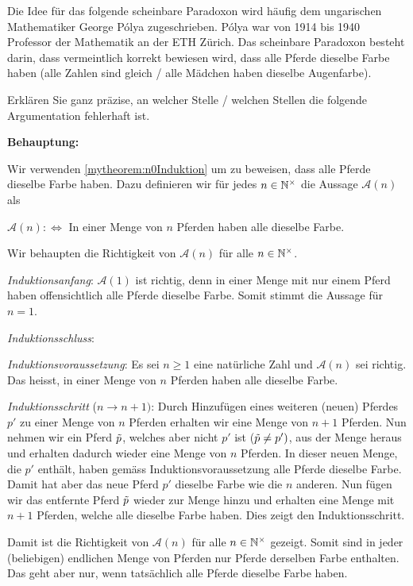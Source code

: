 \clearpage
\begin{myexercise}\label{myexercise:0268}
	Die Idee für das folgende scheinbare Paradoxon wird häufig dem ungarischen Mathematiker George Pólya zugeschrieben. Pólya war von 1914 bis 1940 Professor der Mathematik an der ETH Zürich. Das scheinbare Paradoxon besteht darin, dass vermeintlich korrekt bewiesen wird, dass alle Pferde dieselbe Farbe haben (alle Zahlen sind gleich / alle Mädchen haben dieselbe Augenfarbe).

	Erklären Sie ganz präzise, an welcher Stelle / welchen Stellen die folgende Argumentation fehlerhaft ist.

	\noindent
	\textbf{Behauptung:}

	Wir verwenden \cref{mytheorem:n0Induktion} um zu beweisen, dass alle Pferde dieselbe Farbe haben. Dazu definieren wir für jedes $n\in\mathbb{N}^{\times}$ die Aussage $\mathcal{A}(n)$ als
	\begin{center}
		$\mathcal{A}(n) :\iff $ In einer Menge von $n$ Pferden haben alle dieselbe Farbe.
	\end{center}
	Wir behaupten die Richtigkeit von $\mathcal{A}(n)$ für alle $n\in\mathbb{N}^{\times}$.

	\begin{myproof}
		\begin{aenum}
			\item \textit{Induktionsanfang}: $\mathcal{A}(1)$ ist richtig, denn in einer Menge mit nur einem Pferd haben offensichtlich alle Pferde dieselbe Farbe. Somit stimmt die Aussage für $n=1$.
			\item \textit{Induktionsschluss}:
			\begin{renum}
				\item \textit{Induktionsvoraussetzung}: Es sei $n\geq 1$ eine natürliche Zahl und $\mathcal{A}(n)$ sei richtig. Das heisst, in einer Menge von $n$ Pferden haben alle dieselbe Farbe.
				\item \textit{Induktionsschritt} ($n\to n+1)$: Durch Hinzufügen eines weiteren (neuen) Pferdes $p'$ zu einer Menge von $n$ Pferden erhalten wir eine Menge von $n+1$ Pferden. Nun nehmen wir ein Pferd $\Tilde{p}$, welches aber nicht $p'$ ist ($\Tilde{p}\neq p')$, aus der Menge heraus und erhalten dadurch wieder eine Menge von $n$ Pferden. In dieser neuen Menge, die $p'$ enthält, haben gemäss Induktionsvoraussetzung alle Pferde dieselbe Farbe. Damit hat aber das neue Pferd $p'$ dieselbe Farbe wie die $n$ anderen. Nun fügen wir das entfernte Pferd $\Tilde{p}$ wieder zur Menge hinzu und erhalten eine Menge mit $n+1$ Pferden, welche alle dieselbe Farbe haben. Dies zeigt den Induktionsschritt.
			\end{renum}
		\end{aenum}
		Damit ist die Richtigkeit von $\mathcal{A}(n)$ für alle $n\in\mathbb{N}^{\times}$ gezeigt. Somit sind in jeder (beliebigen) endlichen Menge von Pferden nur Pferde derselben Farbe enthalten. Das geht aber nur, wenn tatsächlich alle Pferde dieselbe Farbe haben.
	\end{myproof}
\end{myexercise}


